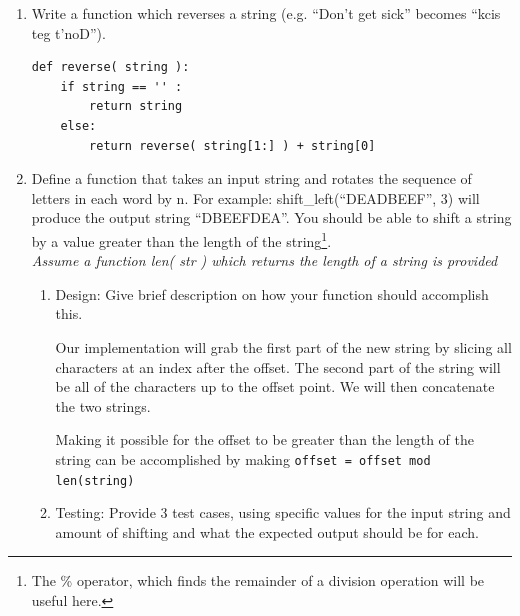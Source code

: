 \documentclass[11pt]{article}
\author{Computer Science Community}
\newenvironment{answer}{\large\lstset{basicstyle=\large}\color{white}}{}
\newenvironment{answer}{\large\lstset{basicstyle=\large}\color{red}}{}
\begin{document}

\begin{enumerate}
    \item\label{reverse()} Write a function which reverses a string (e.g. ``Don't
        get sick'' becomes ``kcis teg t'noD'').

\begin{answer}
\begin{lstlisting}
def reverse( string ):
    if string == '' :
        return string
    else:
        return reverse( string[1:] ) + string[0]
\end{lstlisting}
\end{answer}

    \item Define a function that takes an input string and rotates the sequence
        of letters in each word by n. For example: shift\_left(``DEADBEEF'', 3)
        will produce the output string ``DBEEFDEA''. You should be able to
        shift a string by a value greater than the length of the
        string\footnote{The \% operator, which finds the remainder of a
        division operation will be useful here.}.\\ 
        \emph{Assume a function len( str ) which returns the length of a string is provided}


    \begin{enumerate}
        \item Design: Give brief description on how your function should
            accomplish this.

            \begin{answer}
            Our implementation will grab the first part of the new string by
            slicing all characters at an index after the offset. The second
            part of the string will be all of the characters up to the offset
            point. We will then concatenate the two strings.

            Making it possible for the offset to be greater than the length of
            the string can be accomplished by making {\tt offset = offset mod
            len(string)}
            \end{answer}

        \item Testing: Provide 3 test cases, using specific values for the input
            string and amount of shifting and what the expected output should be
            for each.


\end{enumerate}
\end{enumerate}
\end{document}
